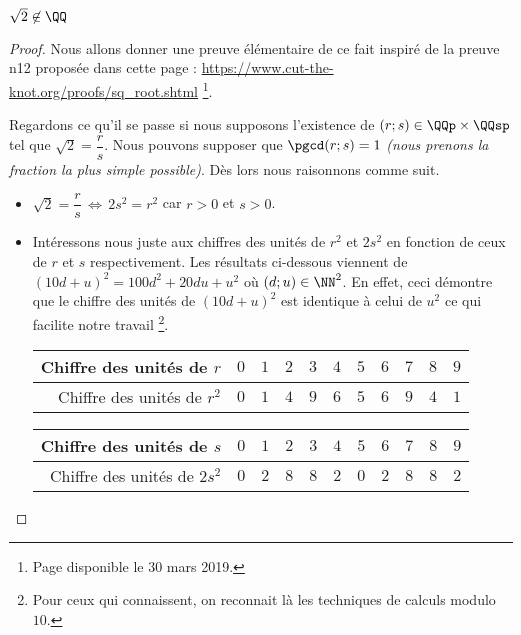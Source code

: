 \begin{fact} \label{sqrt-2-not-in-Q}
	$\sqrt2 \not\in \QQ$
\end{fact}

\begin{proof}
	Nous allons donner une preuve élémentaire de ce fait inspiré de la preuve n\textdegree{}12 proposée dans cette page : \url{https://www.cut-the-knot.org/proofs/sq_root.shtml} 
	\footnote{
		Page disponible le 30 mars 2019.
	}.
	
	\medskip
	
	Regardons ce qu'il se passe si nous supposons l'existence de $(r ; s) \in \QQp \times \QQsp$ tel que $\sqrt2 = \dfrac{r}{s}$. Nous pouvons supposer que $\pgcd(r ; s) = 1$ \emph{(nous prenons la fraction la plus simple possible)}.
	Dès lors nous raisonnons comme suit.
	
	\begin{itemize}[label=\small\textbullet]
		\item $\sqrt2 = \dfrac{r}{s} \, \Leftrightarrow \, 2 s^2 = r^2$ car $r > 0$ et $s > 0$.


		\item Intéressons nous juste aux chiffres des unités de $r^2$ et $2s^2$ en fonction de ceux de $r$ et $s$ respectivement. Les résultats ci-dessous viennent de $(10d + u)^2 = 100d^2 + 20du + u^2$ où $(d ; u) \in \NN^2$.
		En effet, ceci démontre que le chiffre des unités de $(10d + u)^2$ est identique à celui de $u^2$ ce qui facilite notre travail
		\footnote{
			Pour ceux qui connaissent, on reconnait là les techniques de calculs modulo $10$.
		}.
		\begin{center}
			\begin{tabular}{|r|c|c|c|c|c|c|c|c|c|c|}
				\hline
				Chiffre des unités de $r$
				  & $0$  &  $1$  &  $2$  &  $3$  &  $4$  &  $5$  &  $6$  &  $7$  &  $8$  &  $9$
				\\ \hline
				\phantom{$2$}Chiffre des unités de $r^2$
				  & $0$  &  $1$  &  $4$  &  $9$  &  $6$  &  $5$  &  $6$  &  $9$  &  $4$  &  $1$
				\\ \hline
			\end{tabular}

			\medskip
			
			\begin{tabular}{|r|c|c|c|c|c|c|c|c|c|c|}
				\hline
				Chiffre des unités de $s$
				  & $0$  &  $1$  &  $2$  &  $3$  &  $4$  &  $5$  &  $6$  &  $7$  &  $8$  &  $9$
				\\ \hline
				Chiffre des unités de $2s^2$
				  & $0$  &  $2$  &  $8$  &  $8$  &  $2$  &  $0$  &  $2$  &  $8$  &  $8$  &  $2$
				\\ \hline
			\end{tabular}
		\end{center}



\end{itemize}
\end{proof}
